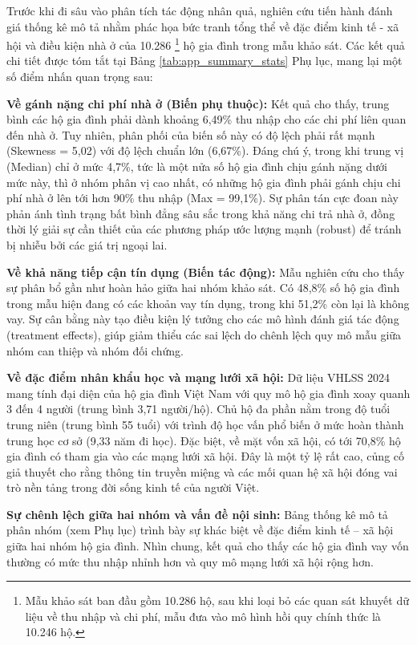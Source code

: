 \documentclass[12pt,a4paper]{report}
\begin{document}
Trước khi đi sâu vào phân tích tác động nhân quả, nghiên cứu tiến hành đánh giá thống kê mô tả nhằm phác họa bức tranh tổng thể về đặc điểm kinh tế - xã hội và điều kiện nhà ở của 10.286 \footnote{Mẫu khảo sát ban đầu gồm 10.286 hộ, sau khi loại bỏ các quan sát khuyết dữ liệu về thu nhập và chi phí, mẫu đưa vào mô hình hồi quy chính thức là 10.246 hộ.} hộ gia đình trong mẫu khảo sát. Các kết quả chi tiết được tóm tắt tại Bảng \ref{tab:app_summary_stats} Phụ lục, mang lại một số điểm nhấn quan trọng sau:

\textbf{Về gánh nặng chi phí nhà ở (Biến phụ thuộc):} 
Kết quả cho thấy, trung bình các hộ gia đình phải dành khoảng 6,49\% thu nhập cho các chi phí liên quan đến nhà ở. Tuy nhiên, phân phối của biến số này có độ lệch phải rất mạnh (Skewness = 5,02) với độ lệch chuẩn lớn (6,67\%). Đáng chú ý, trong khi trung vị (Median) chỉ ở mức 4,7\%, tức là một nửa số hộ gia đình chịu gánh nặng dưới mức này, thì ở nhóm phân vị cao nhất, có những hộ gia đình phải gánh chịu chi phí nhà ở lên tới hơn 90\% thu nhập (Max = 99,1\%). Sự phân tán cực đoan này phản ánh tình trạng bất bình đẳng sâu sắc trong khả năng chi trả nhà ở, đồng thời lý giải sự cần thiết của các phương pháp ước lượng mạnh (robust) để tránh bị nhiễu bởi các giá trị ngoại lai.

\textbf{Về khả năng tiếp cận tín dụng (Biến tác động):} 
Mẫu nghiên cứu cho thấy sự phân bổ gần như hoàn hảo giữa hai nhóm khảo sát. Có 48,8\% số hộ gia đình trong mẫu hiện đang có các khoản vay tín dụng, trong khi 51,2\% còn lại là không vay. Sự cân bằng này tạo điều kiện lý tưởng cho các mô hình đánh giá tác động (treatment effects), giúp giảm thiểu các sai lệch do chênh lệch quy mô mẫu giữa nhóm can thiệp và nhóm đối chứng.

\textbf{Về đặc điểm nhân khẩu học và mạng lưới xã hội:} 
Dữ liệu VHLSS 2024 mang tính đại diện của hộ gia đình Việt Nam với quy mô hộ gia đình xoay quanh 3 đến 4 người (trung bình 3,71 người/hộ). Chủ hộ đa phần nằm trong độ tuổi trung niên (trung bình 55 tuổi) với trình độ học vấn phổ biến ở mức hoàn thành trung học cơ sở (9,33 năm đi học). Đặc biệt, về mặt vốn xã hội, có tới 70,8\% hộ gia đình có tham gia vào các mạng lưới xã hội. Đây là một tỷ lệ rất cao, củng cố giả thuyết cho rằng thông tin truyền miệng và các mối quan hệ xã hội đóng vai trò nền tảng trong đời sống kinh tế của người Việt.


\textbf{Sự chênh lệch giữa hai nhóm và vấn đề nội sinh:}
Bảng thống kê mô tả phân nhóm (xem Phụ lục) trình bày sự khác biệt về đặc điểm kinh tế – xã hội giữa hai nhóm hộ gia đình. Nhìn chung, kết quả cho thấy các hộ gia đình vay vốn thường có mức thu nhập nhỉnh hơn và quy mô mạng lưới xã hội rộng hơn. 
\end{document}

